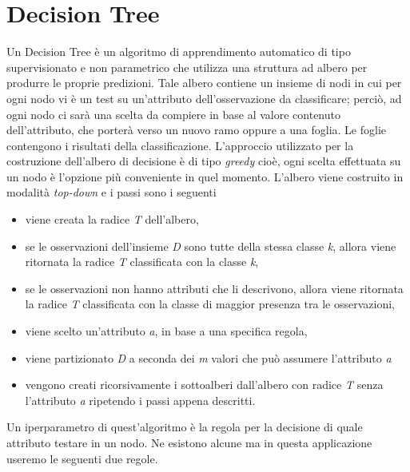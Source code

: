\section{Decision Tree}
Un Decision Tree \autocite{charbuty2021classification} è un algoritmo di apprendimento automatico di tipo supervisionato e non parametrico che utilizza una struttura ad albero per produrre le proprie predizioni. Tale albero contiene un insieme di nodi in cui per ogni nodo vi è un test su un'attributo dell'osservazione da classificare; perciò, ad ogni nodo ci sarà una scelta da compiere in base al valore contenuto dell'attributo, che porterà verso un nuovo ramo oppure a una foglia. Le foglie contengono i risultati della classificazione. L'approccio utilizzato per la costruzione dell'albero di decisione è di tipo \emph{greedy} cioè, ogni scelta effettuata su un nodo è l'opzione più conveniente in quel momento. L'albero viene costruito in modalità \emph{top-down} e i passi sono i seguenti
\begin{itemize}
	\item viene creata la radice \emph{T} dell'albero,
	\item se le osservazioni dell'insieme \emph{D} sono tutte della stessa classe \emph{k}, allora viene ritornata la radice \emph{T} classificata con la classe \emph{k},
	\item se le osservazioni non hanno attributi che li descrivono, allora viene ritornata la radice \emph{T} classificata con la classe di maggior presenza tra le osservazioni,
	\item viene scelto un'attributo \emph{a}, in base a una specifica regola, 
	\item viene partizionato \emph{D} a seconda dei \emph{m} valori che può assumere l'attributo \emph{a} 
	\item vengono creati ricorsivamente i sottoalberi dall'albero con radice \emph{T} senza l'attributo \emph{a} ripetendo i passi appena descritti.
\end{itemize} 
Un iperparametro di quest'algoritmo è la regola per la decisione di quale attributo testare in un nodo. Ne esistono alcune ma in questa applicazione useremo le seguenti due regole.
